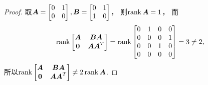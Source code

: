 \begin{example}
\begin{proof}
取\(\boldsymbol{A} = \begin{bmatrix}
	0 & 1 \\
	0 & 0
\end{bmatrix},
\boldsymbol{B} = \begin{bmatrix}
	0 & 1 \\
	1 & 0
\end{bmatrix}\)，
则\(\rank\boldsymbol{A} = 1\)，
而\begin{equation*}
	\rank\begin{bmatrix}
		\boldsymbol{A} & \boldsymbol{B} \boldsymbol{A} \\
		\boldsymbol0 & \boldsymbol{A} \boldsymbol{A}^T
	\end{bmatrix}
	= \rank\begin{bmatrix}
		0 & 1 & 0 & 0 \\
		0 & 0 & 0 & 1 \\
		0 & 0 & 1 & 0 \\
		0 & 0 & 0 & 0
	\end{bmatrix}
	= 3 \neq 2,
\end{equation*}
所以\(\rank\begin{bmatrix}
	\boldsymbol{A} & \boldsymbol{B} \boldsymbol{A} \\
	\boldsymbol0 & \boldsymbol{A} \boldsymbol{A}^T
\end{bmatrix}
\neq 2 \rank\boldsymbol{A}\).
\end{proof}
\end{example}
